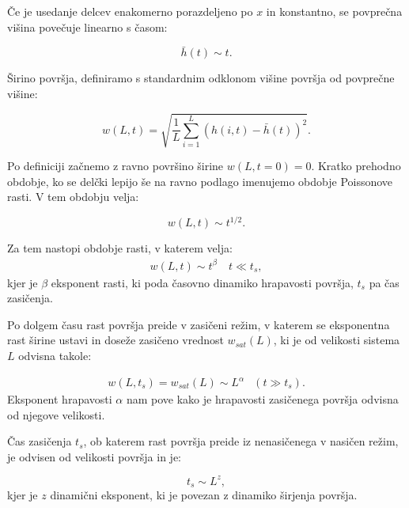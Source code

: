 \documentclass[a4paper, twoside, 12pt]{book}
\begin{document}
Če je usedanje delcev enakomerno porazdeljeno po $x$ in konstantno, se povprečna višina povečuje linearno s časom:

\begin{equation}
  \bar{h}(t) \sim t.
\end{equation}

Širino površja, definiramo s standardnim odklonom višine površja od povprečne višine:

  \begin{equation}
    w(L,t) = \sqrt{\frac{1}{L} \sum_{i=1}^L (h(i,t)-\bar{h}(t))^2}.
    \label{sirina-povrsine}
  \end{equation}

Po definiciji začnemo z ravno površino širine $w(L,t=0)=0$. Kratko prehodno obdobje, ko se delčki lepijo še na ravno podlago imenujemo obdobje Poissonove rasti. V tem obdobju velja: 

\begin{equation}
  w(L,t) \sim t^{1/2}.
\end{equation}

Za tem nastopi obdobje rasti, v katerem velja:
  \begin{equation}
    \begin{array}{lr} w(L,t) \sim t^\beta  & \ t \ll t_s, \end{array}
    \label{beta}
  \end{equation}
kjer je $\beta$ eksponent rasti, ki poda časovno dinamiko hrapavosti površja, $t_s$ pa čas zasičenja.

Po dolgem času rast površja preide v zasičeni režim, v katerem se eksponentna rast širine ustavi in doseže zasičeno vrednost $w_{sat}(L)$, ki je od velikosti sistema $L$ odvisna takole:

  \begin{equation}
    \begin{array}{lr} w(L,t_s) = w_{sat}(L) \sim L^\alpha & (t \gg t_s). \end{array}
    \label{alfa}
  \end{equation}
Eksponent hrapavosti $\alpha$ nam pove kako je hrapavosti zasičenega površja odvisna od njegove velikosti.

Čas zasičenja $t_s$, ob katerem rast površja preide iz nenasičenega v nasičen režim, je odvisen od velikosti površja in je:

  \begin{equation}
    t_s \sim L^z,
    \label{z}
  \end{equation}
kjer je $z$ dinamični eksponent, ki je povezan z dinamiko širjenja površja.
\end{document}
